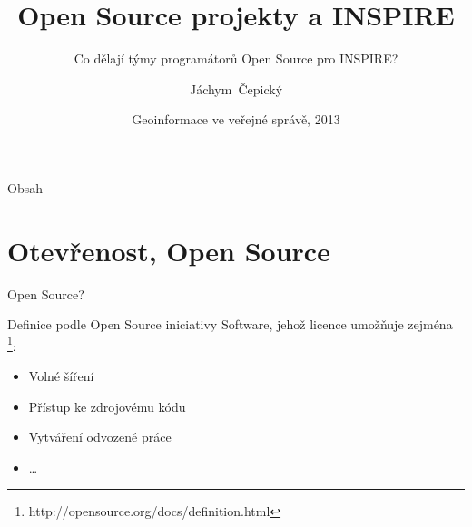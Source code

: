 \documentclass{beamer}
\title[Open Source] %
{Open Source projekty a INSPIRE}
\subtitle {Co dělají týmy programátorů Open Source pro INSPIRE?}
\author[J. Čepický] %
{Jáchym~Čepický\inst{1}}
\institute %
{
  \inst{1}%
  Help Service - Remote Sensing s.r.o. \\
  Benešov\\
  \url{http://hsrs.cz}\\
  \
}
\date[27.5.2013-28.5.2013] %
{Geoinformace ve veřejné správě, 2013}
\begin{document}
\begin{frame}
  \titlepage
\end{frame}

\begin{frame}{Obsah}
  \tableofcontents
\end{frame}





\section{Otevřenost, Open Source}

\begin{frame}{Open Source?}

\begin{block}{Definice podle Open Source iniciativy}
    Software, jehož licence umožňuje zejména \footnote{http://opensource.org/docs/definition.html}:
    \begin{itemize} 
        \item Volné šíření
        \item Přístup ke zdrojovému kódu
        \item Vytváření odvozené práce
        \item \dots
    \end{itemize}
\end{block}
\end{frame}
\end{document}
